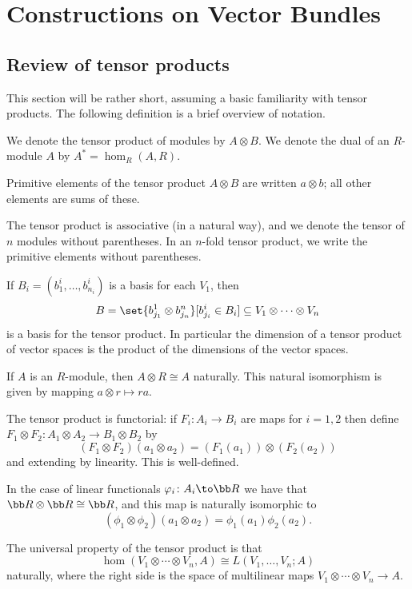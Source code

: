 \section{Constructions on Vector Bundles}

\subsection{Review of tensor products}

This section will be rather short, assuming a basic familiarity with tensor products.
The following definition is a brief overview of notation.

\bdefn

    We denote the tensor product of modules by $A\otimes B$.
    We denote the dual of an $R$-module $A$ by $A^*=\hom_R(A,R)$.

\edefn

\bnote

    Primitive elements of the tensor product $A\otimes B$ are written $a\otimes b$; all other elements are sums of these.

    The tensor product is associative (in a natural way), and we denote the tensor of $n$ modules without parentheses.
    In an $n$-fold tensor product, we write the primitive elements without parentheses.

    If $B_i=(b^i_1,\dots,b^i_{n_i})$ is a basis for each $V_1$, then
    $$ B = \set{b^1_{j_1}\otimes b^n_{j_n}}[b^i_{j_i}\in B_i] \subseteq V_1\otimes\cdots\otimes V_n $$
    is a basis for the tensor product.
    In particular the dimension of a tensor product of vector spaces is the product of the dimensions of the vector spaces.

    If $A$ is an $R$-module, then $A\otimes R\cong A$ naturally.
    This natural isomorphism is given by mapping $a\otimes r\mapsto ra$.

    The tensor product is functorial: if $F_i\colon A_i\to B_i$ are maps for $i=1,2$ then define
    $F_1\otimes F_2\colon A_1\otimes A_2\to B_1\otimes B_2$ by
    $$ (F_1\otimes F_2)(a_1\otimes a_2) = (F_1(a_1))\otimes(F_2(a_2)) $$
    and extending by linearity.
    This is well-defined.

    In the case of linear functionals $\phi_i\colon A_i\to\bR$ we have that $\bR\otimes\bR\cong\bR$, and this map is naturally isomorphic to
    $$ (\phi_1\otimes\phi_2)(a_1\otimes a_2) = \phi_1(a_1)\phi_2(a_2) . $$

    The universal property of the tensor product is that
    $$ \hom(V_1\otimes\cdots\otimes V_n,A) \cong L(V_1,\dots,V_n;A) $$
    naturally, where the right side is the space of multilinear maps $V_1\otimes\cdots\otimes V_n\to A$.

